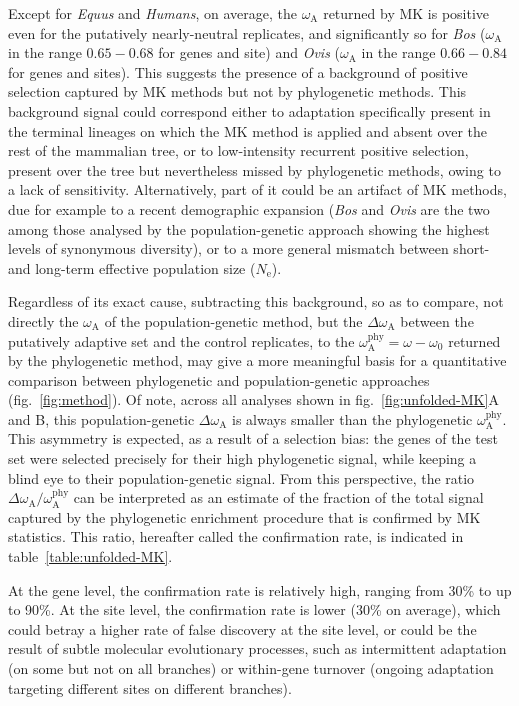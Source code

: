 \documentclass{article}
\newcommand{\Ne}{N_{\mathrm{e}}}
\newcommand{\rateApop}{\omega_{\mathrm{A}}}
\newcommand{\rateAphy}{\rateApop^{\mathrm{phy}}}
\begin{document}
    Except for \textit{Equus} and \textit{Humans}, on average, the $\rateApop$ returned by MK is positive even for the putatively nearly-neutral replicates, and significantly so for \textit{Bos} ($\rateApop$ in the range $0.65-0.68$ for genes and site) and \textit{Ovis} ($\rateApop$ in the range $0.66-0.84$ for genes and sites).
    This suggests the presence of a background of positive selection captured by MK methods but not by phylogenetic methods.
    This background signal could correspond either to adaptation specifically present in the terminal lineages on which the MK method is applied and absent over the rest of the mammalian tree, or to low-intensity recurrent positive selection, present over the tree but nevertheless missed by phylogenetic methods, owing to a lack of sensitivity.
    Alternatively, part of it could be an artifact of MK methods, due for example to a recent demographic expansion (\textit{Bos} and \textit{Ovis} are the two among those analysed by the population-genetic approach showing the highest levels of synonymous diversity), or to a more general mismatch between short- and long-term effective population size ($\Ne$)\cite{rousselle_overestimation_2018}.

    Regardless of its exact cause, subtracting this background, so as to compare, not directly the $\rateApop$ of the population-genetic method, but the $\Delta \rateApop$ between the putatively adaptive set and the control replicates, to the $\rateAphy= \omega - \omega_0$ returned by the phylogenetic method, may give a more meaningful basis for a quantitative comparison between phylogenetic and population-genetic approaches (fig.~\ref{fig:method}).
    Of note, across all analyses shown in fig.~\ref{fig:unfolded-MK}A and B, this population-genetic $\Delta \rateApop$ is always smaller than the phylogenetic $\rateAphy$.
    This asymmetry is expected, as a result of a selection bias: the genes of the test set were selected precisely for their high phylogenetic signal, while keeping a blind eye to their population-genetic signal.
    From this perspective, the ratio $\Delta \rateApop /  \rateAphy$ can be interpreted as an estimate of the fraction of the total signal captured by the phylogenetic enrichment procedure that is confirmed by MK statistics.
    This ratio, hereafter called the confirmation rate, is indicated in table~\ref{table:unfolded-MK}.

    At the gene level, the confirmation rate is relatively high, ranging from 30\% to up to 90\%.
    At the site level, the confirmation rate is lower (30\% on average), which could betray a higher rate of false discovery at the site level, or could be the result of subtle molecular evolutionary processes, such as intermittent adaptation (on some but not on all branches) or within-gene turnover (ongoing adaptation targeting different sites on different branches).
\end{document}
